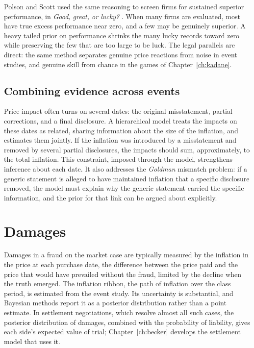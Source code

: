 Polson and Scott used the same reasoning to screen firms for sustained superior performance, in \emph{Good, great, or lucky?} \citep{polson_scott_lucky}. When many firms are evaluated, most have true excess performance near zero, and a few may be genuinely superior. A heavy tailed prior on performance shrinks the many lucky records toward zero while preserving the few that are too large to be luck. The legal parallels are direct: the same method separates genuine price reactions from noise in event studies, and genuine skill from chance in the games of Chapter~\ref{ch:kadane}.

\subsection{Combining evidence across events}

Price impact often turns on several dates: the original misstatement, partial corrections, and a final disclosure. A hierarchical model treats the impacts on these dates as related, sharing information about the size of the inflation, and estimates them jointly. If the inflation was introduced by a misstatement and removed by several partial disclosures, the impacts should sum, approximately, to the total inflation. This constraint, imposed through the model, strengthens inference about each date. It also addresses the \emph{Goldman} mismatch problem: if a generic statement is alleged to have maintained inflation that a specific disclosure removed, the model must explain why the generic statement carried the specific information, and the prior for that link can be argued about explicitly.

\section{Damages}

Damages in a fraud on the market case are typically measured by the inflation in the price at each purchase date, the difference between the price paid and the price that would have prevailed without the fraud, limited by the decline when the truth emerged. The inflation ribbon, the path of inflation over the class period, is estimated from the event study. Its uncertainty is substantial, and Bayesian methods report it as a posterior distribution rather than a point estimate. In settlement negotiations, which resolve almost all such cases, the posterior distribution of damages, combined with the probability of liability, gives each side's expected value of trial; Chapter~\ref{ch:becker} develops the settlement model that uses it.

